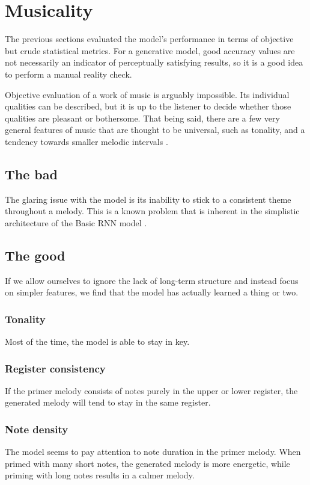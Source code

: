 \documentclass[../../report.tex]{subfiles}
\begin{document}
\section{Musicality}

The previous sections evaluated the model's performance in terms of objective
but crude statistical metrics. For a generative model, good accuracy values are
not necessarily an indicator of perceptually satisfying results, so it is a good
idea to perform a manual reality check.

Objective evaluation of a work of music is arguably impossible. Its individual
qualities can be described, but it is up to the listener to decide whether those
qualities are pleasant or bothersome. That being said, there are a few very
general features of music that are thought to be universal, such as tonality,
and a tendency towards smaller melodic intervals \cite{Mehr2019}.

\subsection{The bad}

The glaring issue with the model is its inability to stick to a consistent theme
throughout a melody. This is a known problem that is inherent in the simplistic
architecture of the Basic RNN model \cite{Abolafia2016}.

\subsection{The good}

If we allow ourselves to ignore the lack of long-term structure and instead
focus on simpler features, we find that the model has actually learned a thing
or two.

\subsubsection{Tonality}
Most of the time, the model is able to stay in key.

\subsubsection{Register consistency}
If the primer melody consists of notes purely in the upper or lower register,
the generated melody will tend to stay in the same register.

\subsubsection{Note density}
The model seems to pay attention to note duration in the primer melody. When
primed with many short notes, the generated melody is more energetic, while
priming with long notes results in a calmer melody.
\end{document}
